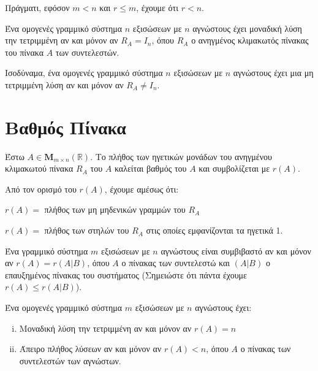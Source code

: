 \begin{rem}
  Πράγματι, εφόσον $ m<n $ και $ r \leq m $, έχουμε ότι $ r<n $.
\end{rem}

\begin{cor}
  Ένα ομογενές γραμμικό σύστημα $n$ εξισώσεων με $n$ αγνώστους έχει μοναδική λύση την 
  τετριμμένη αν και μόνον αν $ R_{A}=I_{n} $, όπου $ R_{A} $ ο ανηγμένος κλιμακωτός 
  πίνακας του πίνακα $ A $ των συντελεστών.
\end{cor}

\begin{rem}
  Ισοδύναμα, ένα ομογενές γραμμικό σύστημα $n$ εξισώσεων με $n$ αγνώστους έχει μια 
  μη τετριμμένη λύση αν και μόνον αν $ R_{A} \neq I_{n} $.
\end{rem}

\section*{Βαθμός Πίνακα}

\begin{dfn}
  Έστω $ A \in \textbf{M}_{m \times n}(\mathbb{R}) $. Το πλήθος των ηγετικών μονάδων 
  του ανηγμένου κλιμακωτού πίνακα $ R_{A} $ του $A$ καλείται \textcolor{Col1}{βαθμός του
  $A$} και συμβολίζεται με $ r(A) $.
\end{dfn}
\begin{rem}
  Από τον ορισμό του $ r(A) $, έχουμε αμέσως ότι: 
  \begin{myitemize}
    \item $ r(A) = $ πλήθος των μη μηδενικών γραμμών του $ R_{A} $ 
    \item $ r(A) = $ πλήθος των στηλών του $ R_{A} $ στις οποίες εμφανίζονται τα 
      ηγετικά 1.
  \end{myitemize}
\end{rem}

\begin{thm}
  Ένα γραμμικό σύστημα $m$ εξισώσεων με $n$ αγνώστους είναι συμβιβαστό αν και μόνον αν 
  $ r(A)=r(A|B) $, όπου $A$ ο πίνακας των συντελεστώ και $ (A|B) $ ο επαυξημένος πίνακας
  του συστήματος (Σημειώστε ότι πάντα έχουμε $ r(A) \leq r(A|B) $).
\end{thm}

\begin{thm}
  Ένα ομογενές γραμμικό σύστημα $m$ εξισώσεων με $n$ αγνώστους έχει:
  \begin{enumerate}[i)]
    \item Μοναδική λύση την τετριμμένη αν και μόνον αν $ r(A)=n $
    \item Άπειρο πλήθος λύσεων αν και μόνον αν $ r(A)<n $, όπου $A$ ο πίνακας των 
      συντελεστών των αγνώστων.
  \end{enumerate}
\end{thm}


